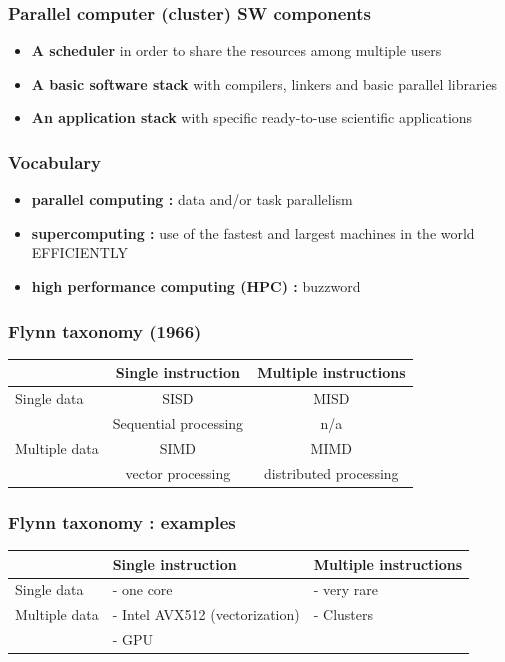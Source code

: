 \begin{frame}[containsverbatim]
\frametitle{Parallel computer (cluster) SW components}
\begin{itemize}
	\item{\textbf{A scheduler} in order to share the resources among multiple users}
	\item{\textbf{A basic software stack} with compilers, linkers and basic parallel libraries}
	\item{\textbf{An application stack} with specific ready-to-use scientific applications}
\end{itemize}
\end{frame}



\begin{frame}[containsverbatim]
\frametitle{Vocabulary}
\begin{itemize}
	\item{\textbf{parallel computing :} data and/or task parallelism}
	\item{\textbf{supercomputing :} use of the fastest and largest machines in the world EFFICIENTLY}
	\item{\textbf{high performance computing (HPC) :} buzzword}
\end{itemize}
\end{frame}



\begin{frame}[containsverbatim]
\frametitle{Flynn taxonomy (1966)}
\begin{center}
\begin{tabular}{ l | c | c | }
	& Single instruction & Multiple instructions \\
\hline
   Single data & SISD & MISD  \\
    & Sequential processing & n/a  \\
\hline
   Multiple data & SIMD & MIMD \\
    & vector processing & distributed processing \\
\hline
 \end{tabular}
\end{center}
\end{frame}

\begin{frame}[containsverbatim]
\frametitle{Flynn taxonomy : examples}
\begin{center}
\begin{tabular}{ l | l | l | }
	& Single instruction & Multiple instructions \\
\hline
   Single data & - one core & - very rare  \\
\hline
   Multiple data & - Intel AVX512 (vectorization) & - Clusters \\
    & - GPU & \\
\hline
 \end{tabular}
\end{center}
\end{frame}


